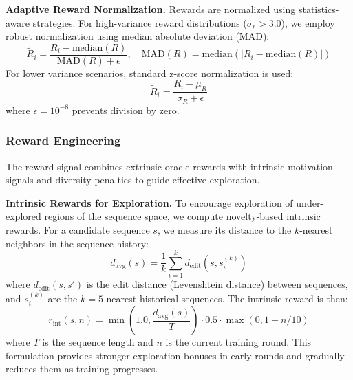 \documentclass[conference]{IEEEtran}
\begin{document}
\textbf{Adaptive Reward Normalization.} Rewards are normalized using statistics-aware strategies. For high-variance reward distributions ($\sigma_r > 3.0$), we employ robust normalization using median absolute deviation (MAD):
%
\begin{equation}
\tilde{R}_i = \frac{R_i - \text{median}(R)}{\text{MAD}(R) + \epsilon}, \quad \text{MAD}(R) = \text{median}(|R_i - \text{median}(R)|)
\end{equation}
%
For lower variance scenarios, standard z-score normalization is used:
%
\begin{equation}
\tilde{R}_i = \frac{R_i - \mu_R}{\sigma_R + \epsilon}
\end{equation}
%
where $\epsilon = 10^{-8}$ prevents division by zero.

\subsubsection{Reward Engineering}

The reward signal combines extrinsic oracle rewards with intrinsic motivation signals and diversity penalties to guide effective exploration.

\textbf{Intrinsic Rewards for Exploration.} To encourage exploration of under-explored regions of the sequence space, we compute novelty-based intrinsic rewards. For a candidate sequence $s$, we measure its distance to the $k$-nearest neighbors in the sequence history:
%
\begin{equation}
d_{\text{avg}}(s) = \frac{1}{k}\sum_{i=1}^{k} d_{\text{edit}}(s, s_i^{(k)})
\end{equation}
%
where $d_{\text{edit}}(s, s')$ is the edit distance (Levenshtein distance) between sequences, and $s_i^{(k)}$ are the $k=5$ nearest historical sequences. The intrinsic reward is then:
%
\begin{equation}
r_{\text{int}}(s, n) = \min\left(1.0, \frac{d_{\text{avg}}(s)}{T}\right) \cdot 0.5 \cdot \max(0, 1 - n/10)
\end{equation}
%
where $T$ is the sequence length and $n$ is the current training round. This formulation provides stronger exploration bonuses in early rounds and gradually reduces them as training progresses.
\end{document}
